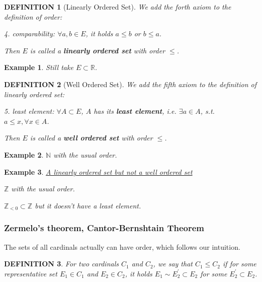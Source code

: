 \documentclass[12pt]{article}
\theoremstyle{blueplain}
\theoremstyle{bluedef}
\newtheorem{definition}{DEFINITION}[section]
\theoremstyle{blueremark}
\newtheorem{example}{Example}[section]
\newcommand{\R}{\mathbb{R}}
\newcommand{\N}{\mathbb{N}}
\newcommand{\Z}{\mathbb{Z}}
\numberwithin{equation}{section}
\begin{document}
      \begin{definition}[Linearly Ordered Set]

        We add the forth axiom to the definition of order:

        4. comparability: $\forall a,b \in E$, it holds $a \leq b$ or $b \leq a$.

        Then $E$ is called a \textbf{linearly ordered set} with order $\leq$.
      \end{definition}

      \begin{example}
        Still take $E \subset \R$.
      \end{example}

      \begin{definition}[Well Ordered Set]

        We add the fifth axiom to the definition of linearly ordered set:

        5. least element: $\forall A \subset E$, $A$ has its \textbf{least element}, i.e. $\exists a \in A$, s.t. $a \leq x, \forall x \in A$.

        Then $E$ is called a \textbf{well ordered set} with order $\leq$.
      \end{definition}

      \begin{example}
        $\N$ with the usual order.
      \end{example}

      \begin{example}\underline{A linearly ordered set but not a well ordered set}

        $\Z$ with the usual order.

        $\Z_{<0} \subset \Z$ but it doesn't have a least element.
      \end{example}

      \subsubsection{Zermelo's theorem, Cantor-Bernshtain Theorem}

      The sets of all cardinals actually can have order, which follows our intuition.

      \begin{definition}
        For two cardinals $C_1$ and $C_2$, we say that $C_1 \leq C_2$ if for some representative set $E_1 \in C_1$ and $E_2 \in C_2$, it holds $E_1 \sim E_2^{\prime} \subset E_2$ for some $E_2^{\prime} \subset E_2$.
      \end{definition}
\end{document}
